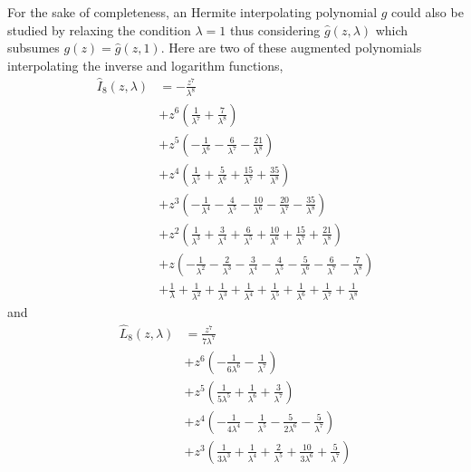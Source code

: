 \begin{remark}
For the sake of completeness, an Hermite interpolating polynomial $g$ could
also be studied by relaxing the condition $\lambda=1$ thus considering
$\hat{g}(z,\lambda)$ which subsumes $g(z)=\hat{g}(z,1)$. Here are two of these
augmented polynomials interpolating the inverse and logarithm functions,
\begin{displaymath}
\begin{split}
\hat{I}_{8}{\left (z, \lambda \right )} &= - \frac{z^{7}}{\lambda^{8}} \\
&+ z^{6} \left(\frac{1}{\lambda^{7}} + \frac{7}{\lambda^{8}}\right) \\
&+ z^{5} \left(- \frac{1}{\lambda^{6}} - \frac{6}{\lambda^{7}} - \frac{21}{\lambda^{8}}\right) \\
&+ z^{4} \left(\frac{1}{\lambda^{5}} + \frac{5}{\lambda^{6}} + \frac{15}{\lambda^{7}} + \frac{35}{\lambda^{8}}\right) \\
&+ z^{3} \left(- \frac{1}{\lambda^{4}} - \frac{4}{\lambda^{5}} - \frac{10}{\lambda^{6}} - \frac{20}{\lambda^{7}} - \frac{35}{\lambda^{8}}\right) \\
&+ z^{2} \left(\frac{1}{\lambda^{3}} + \frac{3}{\lambda^{4}} + \frac{6}{\lambda^{5}} + \frac{10}{\lambda^{6}} + \frac{15}{\lambda^{7}} + \frac{21}{\lambda^{8}}\right) \\
&+ z \left(- \frac{1}{\lambda^{2}} - \frac{2}{\lambda^{3}} - \frac{3}{\lambda^{4}} - \frac{4}{\lambda^{5}} - \frac{5}{\lambda^{6}} - \frac{6}{\lambda^{7}} - \frac{7}{\lambda^{8}}\right) \\
&+ \frac{1}{\lambda} + \frac{1}{\lambda^{2}} + \frac{1}{\lambda^{3}} + \frac{1}{\lambda^{4}} + \frac{1}{\lambda^{5}} + \frac{1}{\lambda^{6}} + \frac{1}{\lambda^{7}} + \frac{1}{\lambda^{8}}
\end{split}
\end{displaymath}
and
\begin{displaymath}
\begin{split}
\hat{L}_{8}{\left (z,\lambda \right )} &= \frac{z^{7}}{7 \lambda^{7}} \\
&+ z^{6} \left(- \frac{1}{6 \lambda^{6}} - \frac{1}{\lambda^{7}}\right) \\
&+ z^{5} \left(\frac{1}{5 \lambda^{5}} + \frac{1}{\lambda^{6}} + \frac{3}{\lambda^{7}}\right) \\
&+ z^{4} \left(- \frac{1}{4 \lambda^{4}} - \frac{1}{\lambda^{5}} - \frac{5}{2 \lambda^{6}} - \frac{5}{\lambda^{7}}\right) \\
&+ z^{3} \left(\frac{1}{3 \lambda^{3}} + \frac{1}{\lambda^{4}} + \frac{2}{\lambda^{5}} + \frac{10}{3 \lambda^{6}} + \frac{5}{\lambda^{7}}\right) \\

\end{split}
\end{displaymath}
\end{remark}
